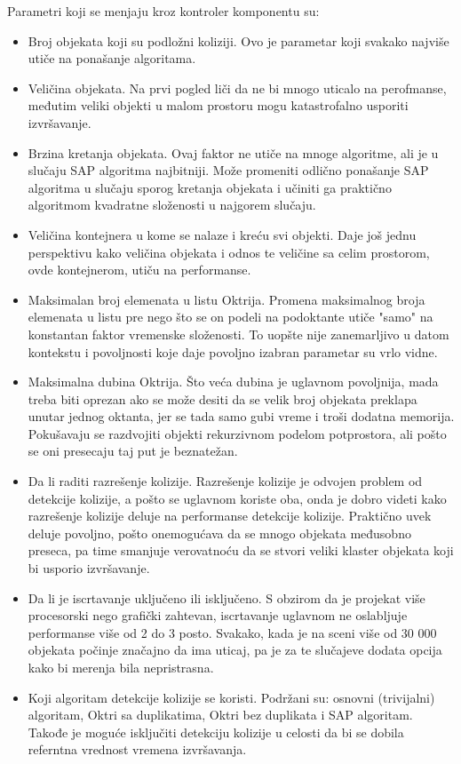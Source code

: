 \documentclass[12pt,oneside]{memoir}
\begin{document}
Parametri koji se menjaju kroz kontroler komponentu su: 
\begin{itemize}  
	\item Broj objekata koji su podložni koliziji. 
	Ovo je parametar koji svakako najviše utiče na ponašanje algoritama.
	\item Veličina objekata. 
	Na prvi pogled liči da ne bi mnogo uticalo na perofmanse, međutim veliki objekti u malom prostoru mogu katastrofalno usporiti izvršavanje.
	\item Brzina kretanja objekata.
	Ovaj faktor ne utiče na mnoge algoritme, ali je u slučaju SAP algoritma najbitniji. Može promeniti odlično ponašanje SAP algoritma u slučaju sporog kretanja 
	objekata i učiniti ga praktično algoritmom kvadratne složenosti u najgorem slučaju.
	\item Veličina kontejnera u kome se nalaze i kreću svi objekti.
	Daje još jednu perspektivu kako veličina objekata i odnos te veličine sa celim prostorom, ovde kontejnerom, utiču na performanse.
	\item Maksimalan broj elemenata u listu Oktrija.
	Promena maksimalnog broja elemenata u listu pre nego što se on podeli na podoktante utiče "samo" na konstantan faktor vremenske složenosti.
	To uopšte nije zanemarljivo u datom kontekstu i povoljnosti koje daje povoljno izabran parametar su vrlo vidne.
	\item Maksimalna dubina Oktrija. Što veća dubina je uglavnom povoljnija, mada treba biti oprezan ako se može desiti 
	da se velik broj objekata preklapa unutar jednog oktanta, jer se tada samo gubi vreme i troši dodatna memorija. 
	Pokušavaju se razdvojiti objekti rekurzivnom podelom potprostora, ali pošto se oni presecaju taj put je beznatežan.
	\item Da li raditi razrešenje kolizije. 
	Razrešenje kolizije je odvojen problem od detekcije kolizije, a pošto se uglavnom koriste oba, onda je dobro videti 
	kako razrešenje kolizije deluje na performanse detekcije kolizije. Praktično uvek deluje povoljno, pošto onemogućava da se mnogo 
	objekata međusobno preseca, pa time smanjuje verovatnoću da se stvori veliki klaster objekata koji bi usporio izvršavanje.
	\item Da li je iscrtavanje uključeno ili isključeno. 
	S obzirom da je projekat više procesorski nego grafički zahtevan, iscrtavanje uglavnom ne oslabljuje performanse više od 2 do 3 posto.
	Svakako, kada je na sceni više od 30 000 objekata počinje značajno da ima uticaj, pa je za te slučajeve dodata opcija kako bi merenja bila nepristrasna.
	\item Koji algoritam detekcije kolizije se koristi. Podržani su: osnovni (trivijalni) algoritam, Oktri sa duplikatima,
	Oktri bez duplikata i SAP algoritam. Takođe je moguće isključiti detekciju kolizije u celosti da bi se dobila referntna vrednost vremena izvršavanja.

\end{itemize}  
\end{document}
